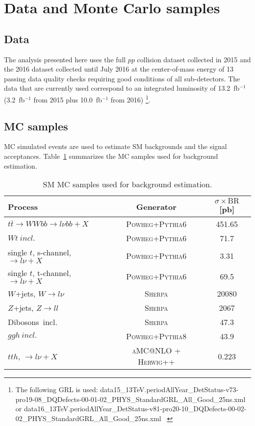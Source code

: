 \section{Data and Monte Carlo samples}
\label{sec:dihiggs_datasamples}

\subsection{Data}
The analysis presented here uses the full $pp$ collision dataset
collected in 2015 and the 2016 dataset collected until July 2016
at the center-of-mass energy of 13\,\TeV\, passing data quality
checks requiring good conditions of all sub-detectors.
The data that are currently used correspond to an integrated
luminosity of 13.2~fb$^{-1}$ (3.2~fb$^{-1}$ from 2015 plus
10.0~fb$^{-1}$ from 2016) \footnote{The following GRL is used:  data15\_13TeV.periodAllYear\_DetStatus-v73-pro19-08\_DQDefects-00-01-02\_PHYS\_StandardGRL\_All\_Good\_25ns.xml       or data16\_13TeV.periodAllYear\_DetStatus-v81-pro20-10\_DQDefects-00-02-02\_PHYS\_StandardGRL\_All\_Good\_25ns.xml   ~\cite{GRL}}.

\subsection{MC samples}
MC simulated events are used to estimate SM
backgrounds and the signal acceptances. Table~\ref{tabular:mc_samples} summarizes the MC samples
used for background estimation.
\begin{table}[!htb]
\caption{SM MC samples used for background estimation.}
\label{tabular:mc_samples}
\begin{center}
\begin{tabular}{|l|c|c|}
  \hline
 Process & Generator       & $\sigma\times\text{BR}$ [pb]  \\ 
\hline

$t\bar{t} \to WWbb \to l \nu bb + X$ & \textsc{Powheg+Pythia6} & 451.65 \\
$Wt~incl.$ & \textsc{Powheg+Pythia6} & 71.7 \\
single $t$,  s-channel, $\to l \nu + X$  & \textsc{Powheg+Pythia6} & 3.31 \\ 
single $t$,  t-channel, $\to l \nu + X$  & \textsc{Powheg+Pythia6} & 69.5 \\ 
$W$+jets, $W \to l \nu$ & \textsc{Sherpa} & 20080 \\
$Z$+jets, $Z \to l l$ & \textsc{Sherpa} & 2067 \\
Dibosons~incl. & \textsc{Sherpa} & 47.3 \\
$ggh~incl.$ & \textsc{Powheg+Pythia8} & 43.9 \\
$tth$, $\to l \nu + X$  & \textsc{aMC@NLO + Herwig++} & 0.223 \\
\hline
\end{tabular}
\end{center}
\end{table}

